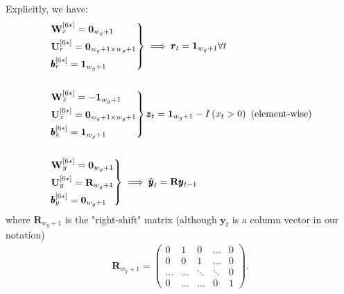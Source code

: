 \documentclass{somasmsc}
\begin{document}
Explicitly, we have:
\begin{align*}
&\begin{rcases}
    \mathbf{W}^{\left[6*\right]}_r = \mathbf{0}_{w_g+1} \\
    \mathbf{U}^{\left[6*\right]}_r = \mathbf{0}_{w_g+1 \times w_g+1} \\
    \pmb{b}^{\left[6*\right]}_r = \mathbf{1}_{w_g+1}
\end{rcases} \implies \pmb{r}_t = \mathbf{1}_{w_g+1} \forall t \\
\\
&\begin{rcases}
    \mathbf{W}^{\left[6*\right]}_z = -\mathbf{1}_{w_g+1} \\
    \mathbf{U}^{\left[6*\right]}_z = \mathbf{0}_{w_g+1 \times w_g+1} \\
    \pmb{b}^{\left[6*\right]}_z = \mathbf{1}_{w_g+1}
\end{rcases} \pmb{z}_t = \mathbf{1}_{w_g+1} - I\left(x_t > 0\right) \text{ (element-wise)} \\
\\
&\begin{rcases}
    \mathbf{W}^{\left[6*\right]}_y = \mathbf{0}_{w_g+1} \\
    \mathbf{U}^{\left[6*\right]}_y = \mathbf{R}_{w_g+1} \\
    \pmb{b}^{\left[6*\right]}_y = \mathbf{0}_{w_g+1}
\end{rcases} \implies \hat{\pmb{y}}_t = \mathbf{R} \pmb{y}_{t-1}
\end{align*}
where $\mathbf{R}_{w_g+1}$ is the "right-shift" matrix (although $\pmb{y}_t$ is a column vector in our notation)
\begin{align*}
\mathbf{R}_{w_g+1} =
\begin{pmatrix}
    0 & 1 & 0 & \dots & 0 \\
    0 & 0 & 1 & \dots & 0 \\
    \dots & \dots & \ddots & \ddots & 0 \\
    0 & \dots & \dots & 0 & 1
\end{pmatrix}.
\end{align*}
\end{document}
